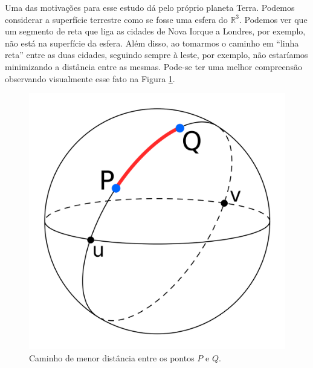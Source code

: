 \documentclass{article}
\begin{document}
Uma das motivações para esse estudo dá pelo próprio planeta Terra. Podemos considerar a superfície terrestre como se fosse uma esfera do $\mathbb{R}^3$. Podemos ver que um segmento de reta que liga as cidades de Nova Iorque a Londres, por exemplo, não está na superfície da esfera. Além disso, ao tomarmos o caminho em ``linha reta'' entre as duas cidades, seguindo sempre à leste, por exemplo, não estaríamos minimizando a distância entre as mesmas. Pode-se ter uma melhor compreensão observando visualmente esse fato na Figura \ref{circle}.
\begin{figure}
    \centering
    \includegraphics[scale = 0.1]{Imagens/circle.png}
    \caption{Caminho de menor distância entre os pontos $P$ e $Q$.}
    \label{circle}
\end{figure}
\end{document}
